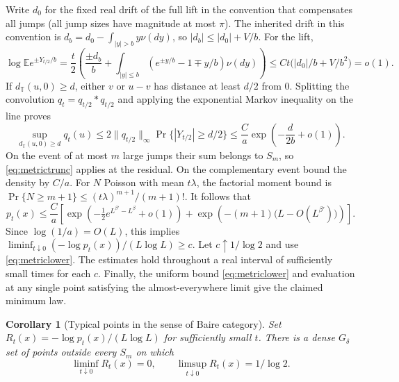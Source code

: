 \documentclass[11pt]{article}
\newtheorem{corollary}[theorem]{Corollary}
\theoremstyle{remark}\newtheorem{remark}[theorem]{Remark}
\begin{document}
Write $d_0$ for the fixed real drift of the full lift in the convention
that compensates all jumps (all jump sizes have magnitude at most $\pi$).
The inherited drift in this convention is
$d_b=d_0-\int_{|y|> b} y\nu(dy)$, so $|d_b|\le|d_0|+V/b$.
For the lift,
\[
 \log\mathbb E e^{\pm Y_{t/2}/b}
 =\frac t2\left(\frac{\pm d_b}{b}
   +\int_{|y|\le b}(e^{\pm y/b}-1\mp y/b)\nu(dy)\right)
 \le C t\bigl(|d_0|/b+ V/b^2\bigr)=o(1).
\]
If $d_{\mathbb T}(u,0)\ge d$, either $v$ or $u-v$ has distance at least
$d/2$ from $0$. Splitting the convolution $q_t=q_{t/2}*q_{t/2}$ and applying
the exponential Markov inequality on the line proves
\begin{equation}\label{eq:metrictrunc}
 \sup_{d_{\mathbb T}(u,0)\ge d}q_t(u)
 \le 2\|q_{t/2}\|_\infty\Pr\{|Y_{t/2}|\ge d/2\}
 \le \frac{C}{a}\exp\left(-\frac{d}{2b}+o(1)\right).
\end{equation}
On the event of at most $m$ large jumps their sum belongs to $S_m$, so
\eqref{eq:metrictrunc} applies at the residual. On the complementary
event bound the density by $C/a$. For $N$ Poisson with mean $t\lambda$,
the factorial moment bound is
$\Pr\{N\ge m+1\}\le(t\lambda)^{m+1}/(m+1)!$.
It follows that
\[
 p_t(x)\le\frac C a\left[
 \exp\left(-\tfrac12 e^{L^{\beta'}-L^\beta}+o(1)\right)
 +\exp\left(-(m+1)\bigl(L-O(L^{\beta'})\bigr)\right)\right].
\]
Since $\log(1/a)=O(L)$, this implies
$\liminf_{t\downarrow0}(-\log p_t(x))/(L\log L)\ge c$.
Let $c\uparrow1/\log2$ and use \eqref{eq:metriclower}. The estimates hold
throughout a real interval of sufficiently small times for each $c$.
Finally, the uniform bound \eqref{eq:metriclower} and evaluation at any
single point satisfying the almost-everywhere limit give the claimed
minimum law.

\begin{corollary}[Typical points in the sense of Baire category]
Set $R_t(x)=-\log p_t(x)/(L\log L)$ for sufficiently small $t$. There is a
dense $G_\delta$ set of points outside every $S_m$ on which
\[
 \liminf_{t\downarrow0}R_t(x)=0,\qquad
 \limsup_{t\downarrow0}R_t(x)=1/\log 2.
\]
\end{corollary}
\end{document}
